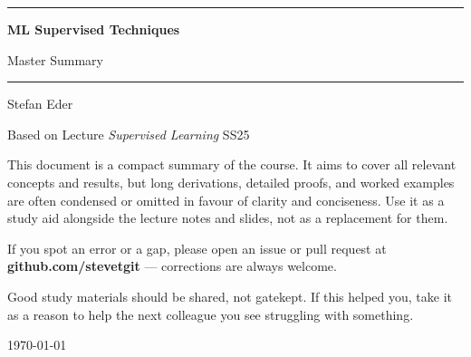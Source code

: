 \documentclass[11pt, oneside]{book}
\newcommand{\coursetitle}{ML Supervised Techniques}
\newcommand{\documenttype}{Master Summary}
\newcommand{\authorname}{Stefan Eder}
\newcommand{\basedon}{Based on Lecture \emph{Supervised Learning} SS25}
\newcommand{\1}{\ind}                       %
\begin{document}
\frontmatter  %


\thispagestyle{empty}
\vspace*{1.8cm}

\begin{center}
  {\color{accent}\rule{\linewidth}{1.8pt}}
  \vspace{0.65cm}

  {\fontsize{28}{34}\selectfont\bfseries\color{accent}\coursetitle\par}
  \vspace{0.25cm}
  {\large\color{gray!80!black}\documenttype\par}

  \vspace{0.55cm}
  {\color{accent!35}\rule{\linewidth}{0.5pt}}
  \vspace{0.55cm}

  {\large\authorname\par}
  \vspace{0.2cm}
  {\small\color{gray!70}\basedon\par}
\end{center}

\vspace{1.6cm}

\begin{center}
\begin{minipage}{0.84\textwidth}
  \small\color{gray!80!black}
  This document is a compact summary of the course.
  It aims to cover all relevant concepts and results, but long derivations,
  detailed proofs, and worked examples are often condensed or omitted in
  favour of clarity and conciseness.
  Use it as a study aid alongside the lecture notes and slides, not as a
  replacement for them.

  \medskip
  If you spot an error or a gap, please open an issue or pull request at
  \textbf{github.com/stevetgit} --- corrections are always welcome.

  \medskip
  \color{gray!60!black}
  Good study materials should be shared, not gatekept.
  If this helped you, take it as a reason to help the next colleague you see struggling with something.
\end{minipage}
\end{center}

\vfill
{\centering\small\color{gray!65} \today\par}
\clearpage
\end{document}
